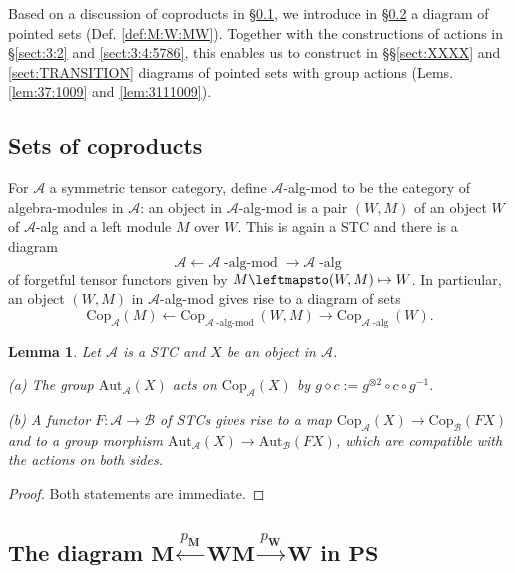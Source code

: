 \documentclass[10pt]{amsart}
\newtheorem{lem}[thm]{Lemma}
\numberwithin{equation}{subsection}
\begin{document}
Based on a discussion of coproducts in §\ref{sect:3:1:5786}, we introduce in §\ref{sect:2:3:titi} a diagram of 
pointed sets (Def. \ref{def:M:W:MW}). Together with the constructions of actions in §\ref{sect:3:2} and 
\ref{sect:3:4:5786}, this enables us to construct in §§\ref{sect:XXXX} and \ref{sect:TRANSITION} 
diagrams of pointed sets with group actions (Lems. \ref{lem:37:1009} and \ref{lem:3111009}).

\subsection{Sets of coproducts}\label{sect:3:1:5786}

For $\mathcal A$ a symmetric tensor category, define $\mathcal A$-alg-mod to be 
the category of algebra-modules in $\mathcal A$: an object in $\mathcal A$-alg-mod is a pair $(W,M)$ of an object $W$
of $\mathcal A$-alg and a left module $M$ over $W$. This is again a STC and 
there is a diagram 
$$
\mathcal A\leftarrow\mathcal A\operatorname{-alg-mod}\to\mathcal A\operatorname{-alg}
$$
of forgetful tensor functors given by $M\leftmapsto (W,M)\mapsto W$. 
In particular, an object $(W,M)$ in $\mathcal A$-alg-mod gives rise to a
diagram of sets
\begin{equation}\label{diag:com:gal}
\mathrm{Cop}_{\mathcal A}(M)
\leftarrow\mathrm{Cop}_{\mathcal A\operatorname{-alg-mod}}(W,M)
\to\mathrm{Cop}_{\mathcal A\operatorname{-alg}}(W). 
\end{equation}

\begin{lem}\label{lem:cat:act}
Let $\mathcal A$ is a STC and $X$ be an object in $\mathcal A$. 

(a) The group $\mathrm{Aut}_{\mathcal A}(X)$ acts on $\mathrm{Cop}_{\mathcal A}(X)$ by $g\diamond c:=g^{\otimes 2}\circ c\circ g^{-1}$. 

(b) A functor $F : \mathcal A\to\mathcal B$ of STCs gives rise to a map $\mathrm{Cop}_{\mathcal A}(X)\to\mathrm{Cop}_{\mathcal B}(FX)$ and to a 
group morphism $\mathrm{Aut}_{\mathcal A}(X)\to\mathrm{Aut}_{\mathcal B}(FX)$, which are compatible with the actions on both sides. 
\end{lem}

\begin{proof} Both statements are immediate.  
\end{proof}

\subsection{The diagram $\mathbf M\stackrel{p_{\mathbf M}}{\leftarrow}\mathbf{WM}\stackrel{p_{\mathbf W}}{\to} 
\mathbf{W}$ in $\mathbf{PS}$}
\label{sect:2:3:titi}\label{sect:a:diag:in:PS}
\end{document}

